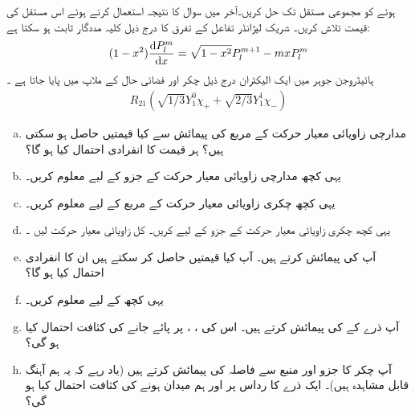  ہوئے  کو مجموعی مستقل  تک حل کریں۔آخر میں سوال    کا نتیجہ استعمال کرتے ہوئے اس مستقل کی قیمت تلاش کریں۔ شریک لیژانڈر تفاعل کے تفرق کا درج ذیل کلیہ مددگار ثابت ہو سکتا ہے:
\begin{align}
    (1-x^{2})\frac{ \dif  P_{l}^{m}} {\dif x}=\sqrt{1-x^{2}}  P_{l}^{m+1}-mxP_{l}^{m}
\end{align}
ہائیڈروجن جوہر میں ایک الیکٹران درج ذیل چکر اور فضائی حال کے ملاپ میں پایا جاتا ہے ۔
\begin{align*}
    R_{21}(\sqrt{1/3}Y_{1}^{0}\chi_+ + \sqrt{2/3}Y_{1}^{1}\chi_-)
\end{align*} 
\begin{enumerate}[a.]
\item
 مدارچی زاویائی معیار حرکت کے مربع  کی پیمائش سے کیا قیمتیں حاصل ہو سکتی ہیں؟ ہر قیمت کا انفرادی احتمال کیا ہو گا؟ 
\item 
یہی کچھ مدارچی  زاویائی معیار حرکت کے    جزو  کے لیے معلوم کریں۔
\item 
یہی کچھ چکری زاویائی معیار حرکت کے مربع   کے لیے معلوم کریں۔
\item
 یہی کچھ چکری زاویائی معیار حرکت  کے   جزو   کے لیے کریں۔ کل زاویائی معیار حرکت     لیں ۔
\item
 آپ  کی پیمائش کرتے ہیں۔  آپ کیا قیمتیں حاصل کر سکتے ہیں ان کا انفرادی احتمال کیا ہو گا؟
\item
 یہی کچھ  کے لیے معلوم کریں۔
\item
  آپ ذرے کے   کی پیمائش کرتے ہیں۔ اس کی ،  ،    پر پائے جانے کی کثافت احتمال کیا ہو گی؟ 
\item
 آپ چکر کا  جزو  اور منبع سے فاصلہ کی پیمائش کرتے ہیں (یاد رہے کہ یہ ہم آہنگ قابل مشاہدہ  ہیں)۔ ایک ذرے کا رداس   پر اور ہم میدان ہونے کی کثافت احتمال کیا ہو گی؟ 
\end{enumerate}
